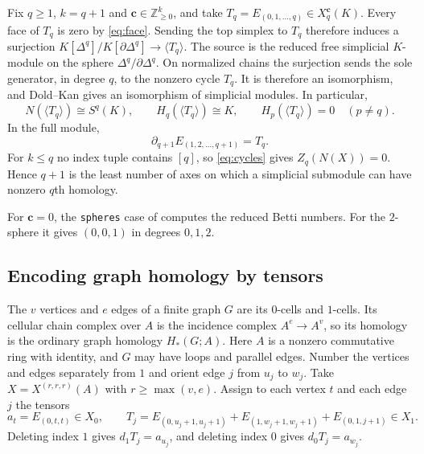 \begin{example}\label{ex:sparse-higher-cycle}
Fix $q\geq1$, $k=q+1$ and $\mathbf c\in\mathbb Z_{\geq0}^k$,
and take $T_q=E_{(0,1,\ldots,q)}\in X^{\mathbf c}_q(K)$.
Every face of $T_q$ is zero by \eqref{eq:face}. Sending the top simplex to
$T_q$ therefore induces a surjection $K[\Delta^q]/K[\partial\Delta^q]\to
\langle T_q\rangle$. The source is the reduced free simplicial $K$-module on
the sphere $\Delta^q/\partial\Delta^q$. On normalized chains the surjection sends the sole generator,
in degree $q$, to the nonzero cycle $T_q$. It is therefore an isomorphism,
and Dold--Kan gives an isomorphism of simplicial modules. In particular,
\[
 N(\langle T_q\rangle)\cong S^q(K),\qquad
 H_q(\langle T_q\rangle)\cong K,\qquad
 H_p(\langle T_q\rangle)=0\quad(p\ne q).
\]
In the full module,
\[
 \partial_{q+1}E_{(1,2,\ldots,q+1)}=T_q.
\]
For $k\leq q$ no index tuple contains $[q]$, so \eqref{eq:cycles} gives
$Z_q(N(X))=0$. Hence $q+1$ is the least number of axes on which a simplicial
submodule can have nonzero $q$th homology.
\end{example}

For $\mathbf c=0$, the \texttt{spheres} case of
 computes the
reduced Betti numbers. For the $2$-sphere it gives $(0,0,1)$ in degrees $0,1,2$.

\subsection{Encoding graph homology by tensors}

The $v$ vertices and $e$ edges of a finite graph $G$ are its $0$-cells
and $1$-cells. Its cellular chain complex over $A$ is the incidence complex
$A^e\to A^v$, so its homology is the ordinary graph homology $H_*(G;A)$.
Here $A$ is a nonzero commutative ring with identity, and $G$ may have
loops and parallel edges. Number the vertices and edges separately from $1$
and orient edge $j$ from $u_j$ to $w_j$.
Take $X=X^{(r,r,r)}(A)$ with $r\geq\max(v,e)$. Assign to each
vertex $t$ and each edge $j$ the tensors
\[
 a_t=E_{(0,t,t)}\in X_0,\qquad
 T_j=E_{(0,u_j+1,u_j+1)}+E_{(1,w_j+1,w_j+1)}
              +E_{(0,1,j+1)}\in X_1.
\]
Deleting index $1$ gives $d_1T_j=a_{u_j}$, and deleting index $0$ gives
$d_0T_j=a_{w_j}$.


